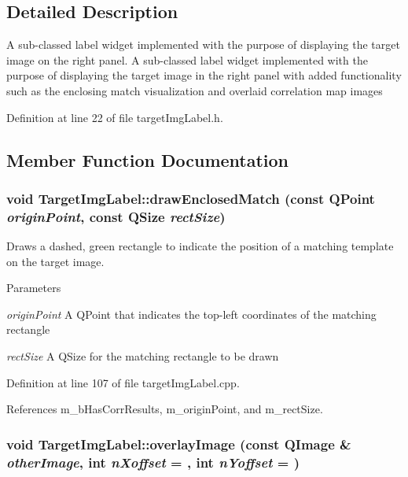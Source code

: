 \subsection{Detailed Description}
A sub-\/classed label widget implemented with the purpose of displaying the target image on the right panel. A sub-\/classed label widget implemented with the purpose of displaying the target image in the right panel with added functionality such as the enclosing match visualization and overlaid correlation map images 

Definition at line 22 of file targetImgLabel.h.

\subsection{Member Function Documentation}
\hypertarget{classTargetImgLabel_ab835774d14df1e93cb0fd010d1a2e699}{
\subsubsection[{drawEnclosedMatch}]{\setlength{\rightskip}{0pt plus 5cm}void TargetImgLabel::drawEnclosedMatch (const QPoint {\em originPoint}, \/  const QSize {\em rectSize})}}
\label{classTargetImgLabel_ab835774d14df1e93cb0fd010d1a2e699}


Draws a dashed, green rectangle to indicate the position of a matching template on the target image. 
\begin{DoxyParams}{Parameters}
\item[{\em originPoint}]A QPoint that indicates the top-\/left coordinates of the matching rectangle \item[{\em rectSize}]A QSize for the matching rectangle to be drawn \end{DoxyParams}


Definition at line 107 of file targetImgLabel.cpp.

References m\_\-bHasCorrResults, m\_\-originPoint, and m\_\-rectSize.\hypertarget{classTargetImgLabel_a09dbad77c225942d7a604e06a119f60d}{
\subsubsection[{overlayImage}]{\setlength{\rightskip}{0pt plus 5cm}void TargetImgLabel::overlayImage (const QImage \& {\em otherImage}, \/  int {\em nXoffset} = {}, \/  int {\em nYoffset} = {})}}
\label{classTargetImgLabel_a09dbad77c225942d7a604e06a119f60d}


